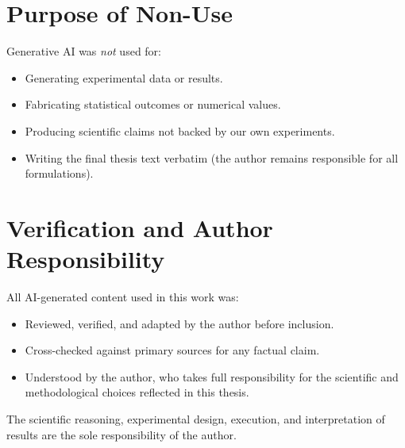 \section*{Purpose of Non-Use}

Generative AI was \emph{not} used for:

\begin{itemize}
    \item Generating experimental data or results.
    \item Fabricating statistical outcomes or numerical values.
    \item Producing scientific claims not backed by our own experiments.
    \item Writing the final thesis text verbatim (the author remains
        responsible for all formulations).
\end{itemize}

\section*{Verification and Author Responsibility}

All AI-generated content used in this work was:

\begin{itemize}
    \item Reviewed, verified, and adapted by the author before inclusion.
    \item Cross-checked against primary sources for any factual claim.
    \item Understood by the author, who takes full responsibility for the
        scientific and methodological choices reflected in this thesis.
\end{itemize}

The scientific reasoning, experimental design, execution, and interpretation
of results are the sole responsibility of the author.
